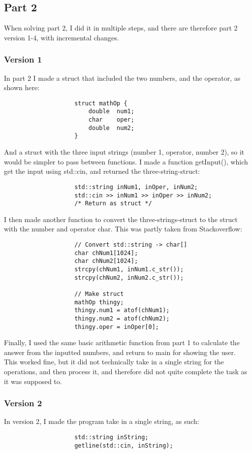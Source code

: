 \documentclass{article}
\begin{document}
		
		\subsection{Part 2}
			When solving part 2, I did it in multiple steps, and there are therefore part 2 version 1-4, with incremental changes.
			\subsubsection{Version 1}
				In part 2 I made a struct that included the two numbers, and the operator, as shown here:
				\begin{lstlisting}
					struct mathOp {
						double	num1;
						char	oper;
						double	num2;
					}
				\end{lstlisting}
				
				And a struct with the three input strings (number 1, operator, number 2), so it would be simpler to pass between functions. I made a function getInput(), which get the input using std::cin, and returned the three-string-struct:
				\begin{lstlisting}
					std::string inNum1, inOper, inNum2;
					std::cin >> inNum1 >> inOper >> inNum2;
					/* Return as struct */
				\end{lstlisting}
				
				I then made another function to convert the three-strings-struct to the struct with the number and operator char. This was partly taken from Stackoverflow:
				\cite{cppConvStr2Chr}
				\begin{lstlisting}
					// Convert std::string -> char[]
					char chNum1[1024];
					char chNum2[1024];
					strcpy(chNum1, inNum1.c_str());
					strcpy(chNum2, inNum2.c_str());
					
					// Make struct
					mathOp thingy;
					thingy.num1 = atof(chNum1);
					thingy.num2 = atof(chNum2);
					thingy.oper = inOper[0];
				\end{lstlisting}
				
				Finally, I used the same basic arithmetic function from part 1 to calculate the answer from the inputted numbers, and return to main for showing the user. \\
				This worked fine, but it did not technically take in a single string for the operations, and then process it, and therefore did not quite complete the task as it was supposed to.
			
			
			\subsubsection{Version 2}
				In version 2, I made the program take in a single string, as such:
				\begin{lstlisting}
					std::string inString;
					getline(std::cin, inString);
				\end{lstlisting}
				
\end{document}
